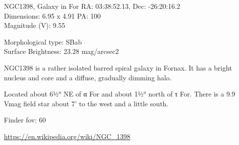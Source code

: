 \begin{block}{NGC1398, Galaxy in For}
    RA: 03:38:52.13, Dec: -26:20:16.2 \\ 
    Dimensions: 6.95 x 4.91 PA: 100 \\ 
    Magnitude (V): 9.55

    Morphological type: SBab \\ 
    Surface Brightness: 23.28 mag/arcsec2

    NGC1398 is a rather isolated barred spiral galaxy in Fornax. It has a
    bright nucleus and core and a diffuse, gradually dimming halo.

    Located about 6½° NE of α For and about 1½° north of τ For. There is a 9.9
    Vmag field star about 7' to the west and a little south.


    Finder fov: 60 

    \url{https://en.wikipedia.org/wiki/NGC_1398} 
\end{block}
